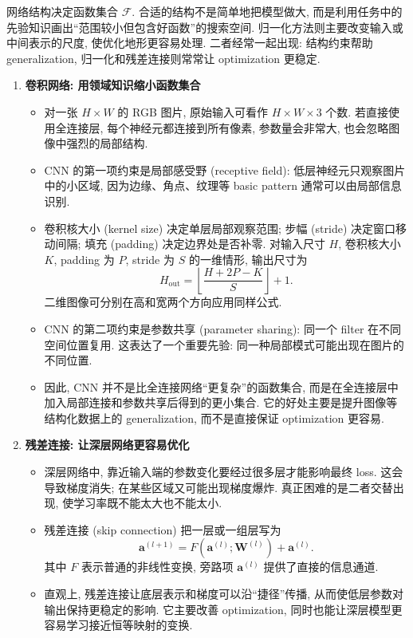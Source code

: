 \documentclass{../nndlcourse}
\begin{document}
网络结构决定函数集合 $\mathcal{F}$. 合适的结构不是简单地把模型做大, 而是利用任务中的先验知识画出“范围较小但包含好函数”的搜索空间. 归一化方法则主要改变输入或中间表示的尺度, 使优化地形更容易处理. 二者经常一起出现: 结构约束帮助 generalization, 归一化和残差连接则常常让 optimization 更稳定.

\begin{enumerate}
  \item \textbf{卷积网络: 用领域知识缩小函数集合}
    \begin{itemize}
      \item 对一张 $H \times W$ 的 RGB 图片, 原始输入可看作 $H \times W \times 3$ 个数. 若直接使用全连接层, 每个神经元都连接到所有像素, 参数量会非常大, 也会忽略图像中强烈的局部结构.
      \item CNN 的第一项约束是局部感受野 (receptive field): 低层神经元只观察图片中的小区域, 因为边缘、角点、纹理等 basic pattern 通常可以由局部信息识别.
      \item 卷积核大小 (kernel size) 决定单层局部观察范围; 步幅 (stride) 决定窗口移动间隔; 填充 (padding) 决定边界处是否补零. 对输入尺寸 $H$, 卷积核大小 $K$, padding 为 $P$, stride 为 $S$ 的一维情形, 输出尺寸为
      \[
        H_{\mathrm{out}}
        =
        \left\lfloor
        \frac{H + 2P - K}{S}
        \right\rfloor + 1.
      \]
      二维图像可分别在高和宽两个方向应用同样公式.
      \item CNN 的第二项约束是参数共享 (parameter sharing): 同一个 filter 在不同空间位置复用. 这表达了一个重要先验: 同一种局部模式可能出现在图片的不同位置.
      \item 因此, CNN 并不是比全连接网络“更复杂”的函数集合, 而是在全连接层中加入局部连接和参数共享后得到的更小集合. 它的好处主要是提升图像等结构化数据上的 generalization, 而不是直接保证 optimization 更容易.
    \end{itemize}
  \item \textbf{残差连接: 让深层网络更容易优化}
    \begin{itemize}
      \item 深层网络中, 靠近输入端的参数变化要经过很多层才能影响最终 loss. 这会导致梯度消失; 在某些区域又可能出现梯度爆炸. 真正困难的是二者交替出现, 使学习率既不能太大也不能太小.
      \item 残差连接 (skip connection) 把一层或一组层写为
      \[
        \boldsymbol{a}^{(l+1)}
        =
        F(\boldsymbol{a}^{(l)}; \boldsymbol{W}^{(l)})
        +
        \boldsymbol{a}^{(l)}.
      \]
      其中 $F$ 表示普通的非线性变换, 旁路项 $\boldsymbol{a}^{(l)}$ 提供了直接的信息通道.
      \item 直观上, 残差连接让底层表示和梯度可以沿“捷径”传播, 从而使低层参数对输出保持更稳定的影响. 它主要改善 optimization, 同时也能让深层模型更容易学习接近恒等映射的变换.

\end{itemize}
\end{enumerate}
\end{document}
